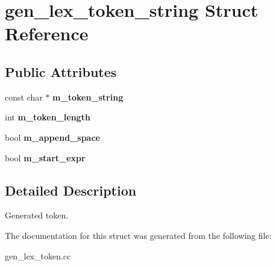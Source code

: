 \hypertarget{structgen__lex__token__string}{}\section{gen\+\_\+lex\+\_\+token\+\_\+string Struct Reference}
\label{structgen__lex__token__string}
\subsection*{Public Attributes}
\begin{DoxyCompactItemize}
\item 
\mbox{\label{structgen__lex__token__string_ad45835dd70c828c5d1fa9e4e439f5111}} 
const char $\ast$ {\bfseries m\+\_\+token\+\_\+string}
\item 
\mbox{\label{structgen__lex__token__string_a09fe11a1a6853a25ea5818177a18b837}} 
int {\bfseries m\+\_\+token\+\_\+length}
\item 
\mbox{\label{structgen__lex__token__string_a7ed50be07c1fed81cea7d02c884b0361}} 
bool {\bfseries m\+\_\+append\+\_\+space}
\item 
\mbox{\label{structgen__lex__token__string_a4a3df24870474a82b0559d94a053fe14}} 
bool {\bfseries m\+\_\+start\+\_\+expr}
\end{DoxyCompactItemize}


\subsection{Detailed Description}
Generated token. 

The documentation for this struct was generated from the following file\+:\begin{DoxyCompactItemize}
\item 
gen\+\_\+lex\+\_\+token.\+cc\end{DoxyCompactItemize}
